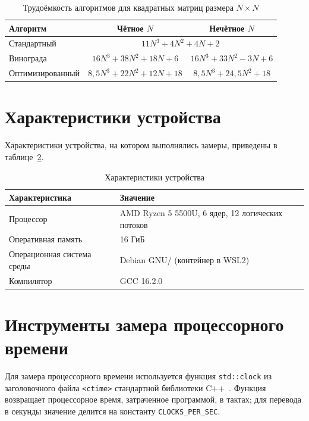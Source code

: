 \documentclass{bmstu}
\begin{document}
\begin{table}[H]
	\centering
	\caption{Трудоёмкость алгоритмов для квадратных матриц размера $N\times N$}
	\label{tab:complexity}
	\small
	\begin{tabular}{|l|c|c|}
		\hline
		Алгоритм         & Чётное $N$                             & Нечётное $N$            \\ \hline
		Стандартный      & \multicolumn{2}{c|}{$11N^3+4N^2+4N+2$}                           \\ \hline
		Винограда        & $16N^3+38N^2+18N+6$                    & $16N^3+33N^2-3N+6$      \\ \hline
		Оптимизированный & $8{,}5N^3+22N^2+12N+18$                & $8{,}5N^3+24{,}5N^2+18$ \\ \hline
	\end{tabular}
\end{table}

\section{Характеристики устройства}
Характеристики устройства, на котором выполнялись замеры, приведены в
таблице~\ref{tab:device}.

\begin{table}[H]
	\centering
	\caption{Характеристики устройства}
	\label{tab:device}
	\begin{tabularx}{\textwidth}{|p{5.5cm}|X|}
		\hline
		Характеристика             & Значение                                         \\ \hline
		Процессор                  & AMD Ryzen 5 5500U, 6 ядер, 12 логических потоков \\ \hline
		Оперативная память         & 16 ГиБ                                           \\ \hline
		Операционная система среды & Debian GNU/ (контейнер в WSL2)                   \\ \hline
		Компилятор                 & GCC 16.2.0                                       \\ \hline
	\end{tabularx}
\end{table}

\section{Инструменты замера процессорного времени}
Для замера процессорного времени используется функция \texttt{std::clock}
из заголовочного файла \texttt{<ctime>} стандартной библиотеки
C++~\cite{cpp20}. Функция возвращает процессорное время, затраченное
программой, в тактах; для перевода в секунды значение делится на константу
\texttt{CLOCKS\_PER\_SEC}.
\end{document}
